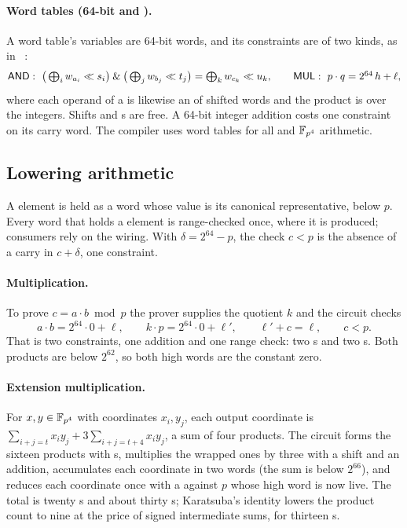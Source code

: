 \paragraph{Word tables (64-bit \AND{} and \MUL{}).}\label{sec:compiler-words} A word table's variables are 64-bit words, and its constraints are of two kinds, as in \Binius{}~\citep{binius64}:
\[
\textstyle \mathsf{AND}:\ \big(\bigoplus_i w_{a_i} \ll s_i\big) \mathbin{\&} \big(\bigoplus_j w_{b_j} \ll t_j\big) = \bigoplus_k w_{c_k} \ll u_k,
\qquad
\mathsf{MUL}:\ p \cdot q = 2^{64}\,h + \ell,
\]
where each operand of a \MUL{} is likewise an \XOR{} of shifted words and the product is over the integers. Shifts and \XOR{}s are free. A 64-bit integer addition costs one \AND{} constraint on its carry word. The compiler uses word tables for all \KB{} and $\mathbb{F}_{p^4}$ arithmetic.

\subsection{Lowering \KB{} arithmetic}

A \KB{} element is held as a word whose value is its canonical representative, below $p$. Every word that holds a \KB{} element is range-checked once, where it is produced; consumers rely on the wiring. With $\delta = 2^{64} - p$, the check $c < p$ is the absence of a carry in $c + \delta$, one \AND{} constraint.

\paragraph{Multiplication.} To prove $c = a\cdot b \bmod p$ the prover supplies the quotient $k$ and the circuit checks
\[
a \cdot b = 2^{64}\cdot 0 + \ell, \qquad k \cdot p = 2^{64}\cdot 0 + \ell', \qquad \ell' + c = \ell, \qquad c < p .
\]
That is two \MUL{} constraints, one addition and one range check: two \MUL{}s and two \AND{}s. Both products are below $2^{62}$, so both high words are the constant zero.

\paragraph{Extension multiplication.} For $x, y \in \mathbb{F}_{p^4}$ with coordinates $x_i, y_j$, each output coordinate is $\sum_{i+j=t} x_i y_j + 3\sum_{i+j=t+4} x_i y_j$, a sum of four products. The circuit forms the sixteen products with \MUL{}s, multiplies the wrapped ones by three with a shift and an addition, accumulates each coordinate in two words (the sum is below $2^{66}$), and reduces each coordinate once with a \MUL{} against $p$ whose high word is now live. The total is twenty \MUL{}s and about thirty \AND{}s; Karatsuba's identity lowers the product count to nine at the price of signed intermediate sums, for thirteen \MUL{}s.

